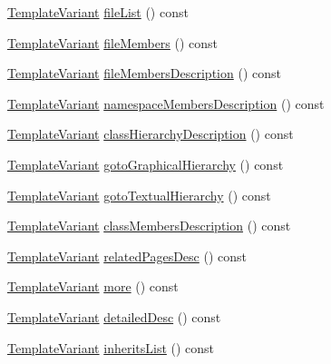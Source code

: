 \begin{DoxyCompactItemize}
\item 
\hyperlink{class_template_variant}{Template\+Variant} \hyperlink{class_translate_context_1_1_private_a50857594d8803554f787b583f2bb2d14}{file\+List} () const 
\item 
\hyperlink{class_template_variant}{Template\+Variant} \hyperlink{class_translate_context_1_1_private_af092a8a31652cf00ce85514cbc6609ed}{file\+Members} () const 
\item 
\hyperlink{class_template_variant}{Template\+Variant} \hyperlink{class_translate_context_1_1_private_abd04483978466e87b6159610dc9ed725}{file\+Members\+Description} () const 
\item 
\hyperlink{class_template_variant}{Template\+Variant} \hyperlink{class_translate_context_1_1_private_a3c8a969556c7c6e0a325a08ec4e11ede}{namespace\+Members\+Description} () const 
\item 
\hyperlink{class_template_variant}{Template\+Variant} \hyperlink{class_translate_context_1_1_private_a7de17c2100fa723e61c95f95e2939b36}{class\+Hierarchy\+Description} () const 
\item 
\hyperlink{class_template_variant}{Template\+Variant} \hyperlink{class_translate_context_1_1_private_ae957e5483194ffd1afefa7595a78da28}{goto\+Graphical\+Hierarchy} () const 
\item 
\hyperlink{class_template_variant}{Template\+Variant} \hyperlink{class_translate_context_1_1_private_ae61445539ca63109d72e0206c36c783f}{goto\+Textual\+Hierarchy} () const 
\item 
\hyperlink{class_template_variant}{Template\+Variant} \hyperlink{class_translate_context_1_1_private_a1a993bf0332e44de40fee496a14e8053}{class\+Members\+Description} () const 
\item 
\hyperlink{class_template_variant}{Template\+Variant} \hyperlink{class_translate_context_1_1_private_a3aef2b4cdecc911d0093a7bbec10fda3}{related\+Pages\+Desc} () const 
\item 
\hyperlink{class_template_variant}{Template\+Variant} \hyperlink{class_translate_context_1_1_private_ad1f2b46a89226b0046a3a90695c1fbec}{more} () const 
\item 
\hyperlink{class_template_variant}{Template\+Variant} \hyperlink{class_translate_context_1_1_private_a581a2bdca0b11b297fd4e2d7b4064bb6}{detailed\+Desc} () const 
\item 
\hyperlink{class_template_variant}{Template\+Variant} \hyperlink{class_translate_context_1_1_private_adb8a4170e1a0034102393462bffee417}{inherits\+List} () const 
\item 

\end{DoxyCompactItemize}
